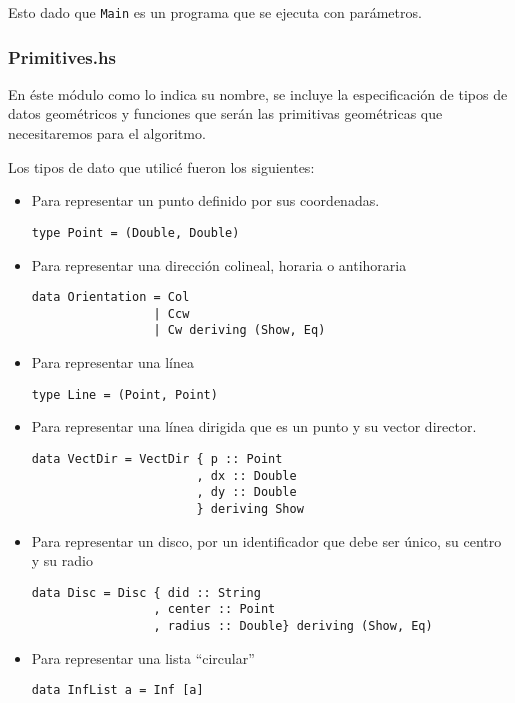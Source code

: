 \documentclass[12pt]{article}
\begin{document}
Esto dado que \texttt{Main} es un programa que se ejecuta con parámetros.

\subsubsection*{Primitives.hs}

\noindent En éste módulo como lo indica su nombre, se incluye la especificación de tipos de datos geométricos y funciones que serán las primitivas geométricas que necesitaremos para el algoritmo.

Los tipos de dato que utilicé fueron los siguientes:

\begin{itemize}
\item Para representar un punto definido por sus coordenadas.

  \begin{verbatim}
type Point = (Double, Double)
  \end{verbatim}

\item Para representar una dirección colineal, horaria o antihoraria

  \begin{verbatim}
data Orientation = Col
                 | Ccw
                 | Cw deriving (Show, Eq)
  \end{verbatim}

\item Para representar una línea

  \begin{verbatim}
type Line = (Point, Point)  
  \end{verbatim}

\item Para representar una línea dirigida que es un punto y su vector director.

  \begin{verbatim}
data VectDir = VectDir { p :: Point
                       , dx :: Double
                       , dy :: Double
                       } deriving Show
  \end{verbatim}

\item Para representar un disco, por un identificador que debe ser único, su centro y su radio

  \begin{verbatim}
data Disc = Disc { did :: String
                 , center :: Point
                 , radius :: Double} deriving (Show, Eq)
  \end{verbatim}

\item Para representar una lista ``circular''

  \begin{verbatim}
data InfList a = Inf [a]
  \end{verbatim}
  
\end{itemize}
\end{document}
